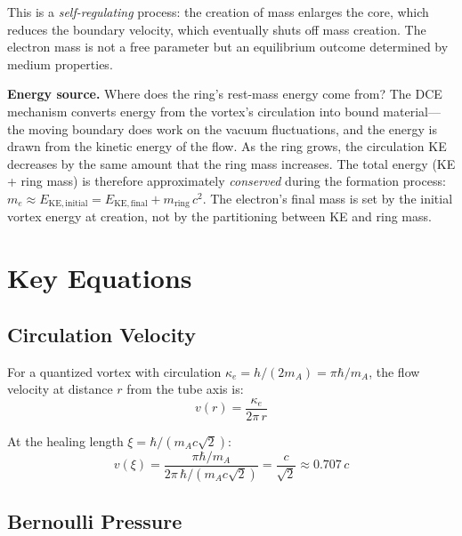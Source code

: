 \documentclass[12pt,letterpaper]{article}
\begin{document}
This is a \emph{self-regulating} process: the creation of mass enlarges the
core, which reduces the boundary velocity, which eventually shuts off mass
creation.  The electron mass is not a free parameter but an equilibrium
outcome determined by medium properties.

\textbf{Energy source.}  Where does the ring's rest-mass energy come from?
The DCE mechanism converts energy from the vortex's circulation into bound
material---the moving boundary does work on the vacuum fluctuations, and
the energy is drawn from the kinetic energy of the flow.  As the ring
grows, the circulation KE decreases by the same amount that the ring mass
increases.  The total energy (KE + ring mass) is therefore approximately
\emph{conserved} during the formation process: $m_e \approx
E_{\mathrm{KE,initial}} = E_{\mathrm{KE,final}} + m_{\mathrm{ring}}\,c^2$.
The electron's final mass is set by the initial vortex energy at creation,
not by the partitioning between KE and ring mass.


\section{Key Equations}
\label{sec:equations}

\subsection{Circulation Velocity}

For a quantized vortex with circulation $\kappa_e = h/(2m_A) = \pi\hbar/m_A$,
the flow velocity at distance $r$ from the tube axis is:
%
\begin{equation}
  v(r) = \frac{\kappa_e}{2\pi\,r}
  \label{eq:v-of-r}
\end{equation}

At the healing length $\xi = \hbar/(m_A c\sqrt{2})$:
%
\begin{equation}
  v(\xi) = \frac{\pi\hbar/m_A}{2\pi\,\hbar/(m_A c\sqrt{2})}
         = \frac{c}{\sqrt{2}} \approx 0.707\,c
  \label{eq:v-healing}
\end{equation}

\subsection{Bernoulli Pressure}
\end{document}
